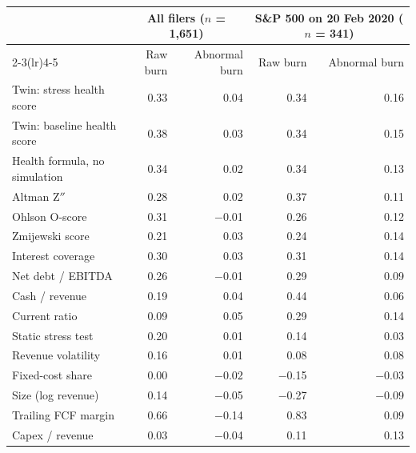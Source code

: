 \begin{tabular}{lrrrr}
\toprule
 & \multicolumn{2}{c}{All filers ($n$ = 1{,}651)} & \multicolumn{2}{c}{S\&P 500 on 20 Feb 2020 ($n$ = 341)} \\
\cmidrule(lr){2-3}\cmidrule(lr){4-5}
 & Raw burn & Abnormal burn & Raw burn & Abnormal burn \\
\midrule
Twin: stress health score & 0.33 & 0.04 & 0.34 & 0.16 \\
Twin: baseline health score & 0.38 & 0.03 & 0.34 & 0.15 \\
Health formula, no simulation & 0.34 & 0.02 & 0.34 & 0.13 \\
\addlinespace
Altman Z$''$ & 0.28 & 0.02 & 0.37 & 0.11 \\
Ohlson O-score & 0.31 & $-$0.01 & 0.26 & 0.12 \\
Zmijewski score & 0.21 & 0.03 & 0.24 & 0.14 \\
Interest coverage & 0.30 & 0.03 & 0.31 & 0.14 \\
Net debt / EBITDA & 0.26 & $-$0.01 & 0.29 & 0.09 \\
Cash / revenue & 0.19 & 0.04 & 0.44 & 0.06 \\
Current ratio & 0.09 & 0.05 & 0.29 & 0.14 \\
Static stress test & 0.20 & 0.01 & 0.14 & 0.03 \\
Revenue volatility & 0.16 & 0.01 & 0.08 & 0.08 \\
Fixed-cost share & 0.00 & $-$0.02 & $-$0.15 & $-$0.03 \\
Size (log revenue) & 0.14 & $-$0.05 & $-$0.27 & $-$0.09 \\
\addlinespace
Trailing FCF margin & 0.66 & $-$0.14 & 0.83 & 0.09 \\
Capex / revenue & 0.03 & $-$0.04 & 0.11 & 0.13 \\
\bottomrule
\end{tabular}
